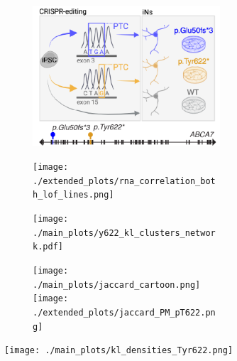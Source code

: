 \begin{figure}[H]
    \begin{subfigure}[t]{.25\textwidth}
        \begin{subfigure}[t]{\textwidth}
            \caption{}
            \includegraphics[width=\textwidth]{./main_plots/iN_cartoon.png}        
        \end{subfigure} 
        \begin{subfigure}[t]{\textwidth}
            \caption{}
            \texttt{[image: ./extended\_plots/rna\_correlation\_both\_lof\_lines.png]}        
        \end{subfigure} 
    \end{subfigure} 
    \begin{subfigure}[t]{.25\textwidth}
        \begin{subfigure}[t]{\textwidth}
            \caption{}
            \texttt{[image: ./main\_plots/y622\_kl\_clusters\_network.pdf]}        
        \end{subfigure}
        \begin{subfigure}[t]{\textwidth}
            \caption{}
            \centering
            \texttt{[image: ./main\_plots/jaccard\_cartoon.png]}        
            \texttt{[image: ./extended\_plots/jaccard\_PM\_pT622.png]}        
        \end{subfigure}  
    \end{subfigure} 
    \begin{subfigure}[t]{.5\textwidth}
        \caption{}
        \texttt{[image: ./main\_plots/kl\_densities\_Tyr622.png]}        
    \end{subfigure}  

\end{figure}
